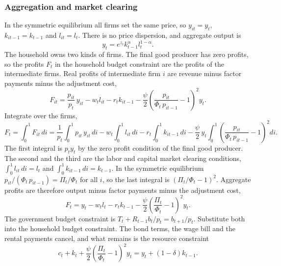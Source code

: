 \documentclass[11pt]{article}
\begin{document}
\subsubsection{Aggregation and market clearing}

In the symmetric equilibrium all firms set the same price, so $y_{it} = y_t$, $k_{it-1} = k_{t-1}$ and $l_{it} = l_t$. There is no price dispersion, and aggregate output is
\begin{equation*}
y_t = e^{z_t} k_{t-1}^{\alpha} l_t^{1-\alpha} .
\end{equation*}
The household owns two kinds of firms. The final good producer has zero profits, so the profits $F_t$ in the household budget constraint are the profits of the intermediate firms. Real profits of intermediate firm $i$ are revenue minus factor payments minus the adjustment cost,
\begin{equation*}
F_{it} = \frac{p_{it}}{p_t}\, y_{it} - w_t l_{it} - r_t k_{it-1} - \frac{\psi}{2} \left( \frac{p_{it}}{\Phi_t\, p_{it-1}} - 1 \right)^2 y_t .
\end{equation*}
Integrate over the firms,
\begin{equation*}
F_t = \int_0^1 F_{it}\, di
= \frac{1}{p_t} \int_0^1 p_{it}\, y_{it}\, di - w_t \int_0^1 l_{it}\, di - r_t \int_0^1 k_{it-1}\, di - \frac{\psi}{2}\, y_t \int_0^1 \left( \frac{p_{it}}{\Phi_t\, p_{it-1}} - 1 \right)^2 di .
\end{equation*}
The first integral is $p_t y_t$ by the zero profit condition of the final good producer. The second and the third are the labor and capital market clearing conditions, $\int_0^1 l_{it}\, di = l_t$ and $\int_0^1 k_{it-1}\, di = k_{t-1}$. In the symmetric equilibrium $p_{it}/(\Phi_t\, p_{it-1}) = \Pi_t/\Phi_t$ for all $i$, so the last integral is $(\Pi_t/\Phi_t - 1)^2$. Aggregate profits are therefore output minus factor payments minus the adjustment cost,
\begin{equation*}
F_t = y_t - w_t l_t - r_t k_{t-1} - \frac{\psi}{2} \left( \frac{\Pi_t}{\Phi_t} - 1 \right)^2 y_t .
\end{equation*}
The government budget constraint is $T_t + R_{t-1} b_t/p_t = b_{t+1}/p_t$. Substitute both into the household budget constraint. The bond terms, the wage bill and the rental payments cancel, and what remains is the resource constraint
\begin{equation*}
c_t + k_t + \frac{\psi}{2} \left( \frac{\Pi_t}{\Phi_t} - 1 \right)^2 y_t = y_t + (1-\delta) k_{t-1} .
\end{equation*}
\end{document}
